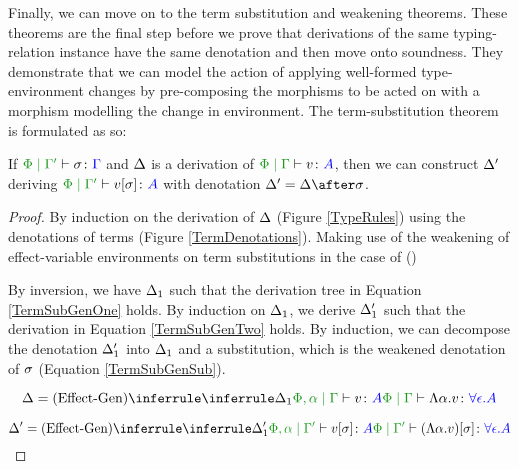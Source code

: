Finally, we can move on to the term substitution and weakening theorems. These theorems are the final step before we prove that derivations of the same typing-relation instance have the same denotation and then move onto soundness. They demonstrate that we can model the action of applying well-formed type-environment changes by pre-composing the morphisms to be acted on with a morphism modelling the change in environment. The term-substitution theorem is formulated as so: 

\begin{framed}
    \begin{theorem}\label{TermSubstitutionOnTerms}
        If $\etyperelation{\P}{\G'}{\si}{\G}$ and $\Delta$ is a derivation of $\gpetyperelation{v}{A}$, then we can construct $\Delta'$ deriving $\etyperelation{\P}{\G'}{v\ssi}{A}$ with denotation $\D' = \D \after \si$.
    \end{theorem}
    
    
    \begin{proof}
        By induction on the derivation of $\Delta$ (Figure \ref{TypeRules}) using the denotations of terms (Figure \ref{TermDenotations}). Making use of the weakening of effect-variable environments on term substitutions in the case of (\textit{\vgen})
    
        \case{\vgen}
        
        By inversion, we have $\Delta_1$ such that the derivation tree in Equation \ref{TermSubGenOne} holds. By induction on $\Delta_1$, we derive $\Delta_1'$ such that the derivation in Equation \ref{TermSubGenTwo} holds. By induction, we can decompose the denotation $\Delta_1'$ into $\Delta_1$ and a substitution, which is the weakened denotation of $\sigma$ (Equation \ref{TermSubGenSub}).

        \begin{minipage}{0.45\linewidth}
            \begin{equation} \label{TermSubGenOne}
                \D = \ntreeruleI{\vgen}{\treeruleI{\D_1}{\etyperelation{\P,\a}{\G}{v}{A}}}{\gpetyperelation{\elam{\a}{v}}{\all{\e}{A}}}
            \end{equation}
        \end{minipage}\quad\begin{minipage}{0.45\linewidth}
            \begin{equation}\label{TermSubGenTwo}
                \D' = \ntreeruleI{\vgen}{\treeruleI{\D_1'}{\etyperelation{\P,\a}{\G'}{v\ssi}{A}}}{\etyperelation{\P}{\G'}{(\elam{\a}{v})\ssi}{\all{\e}{A}}}
            \end{equation}
        \end{minipage}


\end{proof}
\end{framed}
